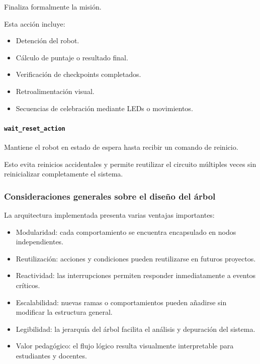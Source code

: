 \documentclass{prgrado}
\begin{document}
Finaliza formalmente la misión.

Esta acción incluye:

\begin{itemize}
    \item Detención del robot.
    \item Cálculo de puntaje o resultado final.
    \item Verificación de checkpoints completados.
    \item Retroalimentación visual.
    \item Secuencias de celebración mediante LEDs o movimientos.
\end{itemize}

\paragraph{\texttt{wait\_reset\_action}}

Mantiene el robot en estado de espera hasta recibir un comando de reinicio.

Esto evita reinicios accidentales y permite reutilizar el circuito múltiples veces sin reinicializar completamente el sistema.

\subsubsection{Consideraciones generales sobre el diseño del árbol}

La arquitectura implementada presenta varias ventajas importantes:

\begin{itemize}
    \item Modularidad: cada comportamiento se encuentra encapsulado en nodos independientes.
    \item Reutilización: acciones y condiciones pueden reutilizarse en futuros proyectos.
    \item Reactividad: las interrupciones permiten responder inmediatamente a eventos críticos.
    \item Escalabilidad: nuevas ramas o comportamientos pueden añadirse sin modificar la estructura general.
    \item Legibilidad: la jerarquía del árbol facilita el análisis y depuración del sistema.
    \item Valor pedagógico: el flujo lógico resulta visualmente interpretable para estudiantes y docentes.
\end{itemize}
\end{document}
